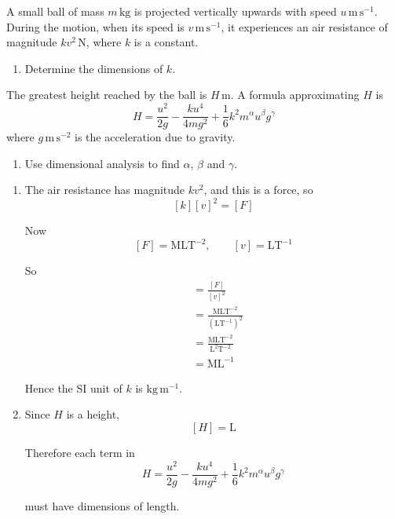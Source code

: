 \documentclass[leqno]{article}
\begin{document}
\begin{enumerate}[
  label=\textbf{\arabic*.},
  leftmargin=*,
  topsep=0pt,
  partopsep=0pt,
  parsep=0pt
]
A small ball of mass $m\,\mathrm{kg}$ is projected vertically upwards with speed $u\,\mathrm{m\,s^{-1}}$. During the motion, when its speed is $v\,\mathrm{m\,s^{-1}}$, it experiences an air resistance of magnitude $kv^2\,\mathrm{N}$, where $k$ is a constant. \\
\begin{enumerate}[label=\textbf{(\alph*)}]
  \item Determine the dimensions of $k$.  \\
\end{enumerate}
The greatest height reached by the ball is $H\,\mathrm{m}$. A formula approximating $H$ is
\[
H = \dfrac{u^2}{2g} - \dfrac{ku^4}{4mg^2} + \dfrac{1}{6}k^2 m^\alpha u^\beta g^\gamma
\]
where $g\,\mathrm{m\,s^{-2}}$ is the acceleration due to gravity. \\
\begin{enumerate}[label=\textbf{(\alph*)}, resume]
  \item Use dimensional analysis to find $\alpha$, $\beta$ and $\gamma$.  \\
\end{enumerate}

\vspace*{10pt}

\begin{djsSolution}
\begin{enumerate}[label=\textbf{(\alph*)}, start=1]
  \item The air resistance has magnitude \(kv^2\), and this is a force, so
\[
[k][v]^2=[F]
\]

Now
\[
[F]=\mathrm{MLT^{-2}}, \qquad [v]=\mathrm{LT^{-1}}
\]

So
\begin{align*}
[k] &= \frac{[F]}{[v]^2}\\
&= \frac{\mathrm{MLT^{-2}}}{(\mathrm{LT^{-1}})^2}\\
&= \frac{\mathrm{MLT^{-2}}}{\mathrm{L^2T^{-2}}}\\
&= \mathrm{ML^{-1}}
\end{align*}


Hence the SI unit of \(k\) is \(\mathrm{kg\,m^{-1}}\).

  \item Since \(H\) is a height,
\[
[H]=\mathrm{L}
\]

Therefore each term in
\[
H = \dfrac{u^2}{2g} - \dfrac{ku^4}{4mg^2} + \dfrac{1}{6}k^2 m^\alpha u^\beta g^\gamma
\]

must have dimensions of length.


\end{enumerate}
\end{djsSolution}
\end{enumerate}
\end{document}

